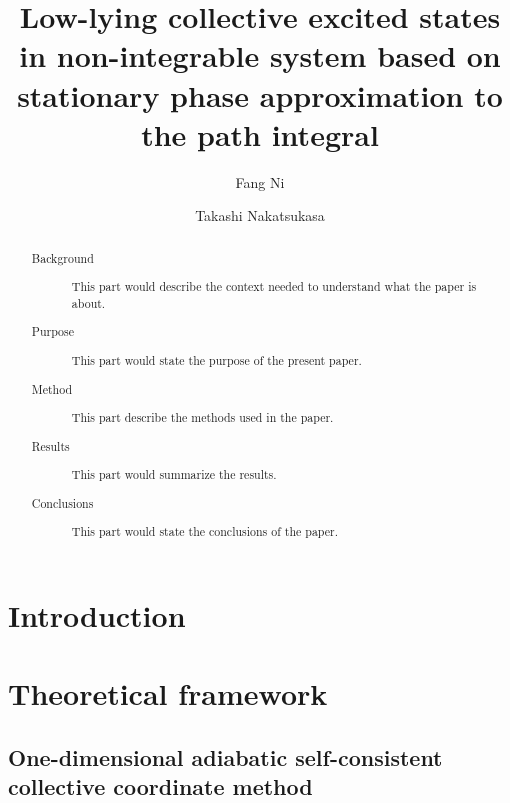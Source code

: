 \documentclass[%
superscriptaddress,
showpacs,
nofootinbib,
amsmath,amssymb,
aps,
prc,
twocolumn,
floatfix ]%
{revtex4-1}
\begin{document}
\renewcommand{\thefootnote}{\fnsymbol{footnote}}

\title{Low-lying collective excited states in non-integrable system based on stationary phase approximation to the path integral}%

\author{Fang Ni}
\author{Takashi Nakatsukasa}

\begin{abstract}
\begin{description}
\item[Background] This part would describe the
context needed to understand what the paper
is about.
\item[Purpose] This part would state the purpose
of the present paper.
\item[Method] This part describe the methods
used in the paper.
\item[Results] This part would summarize the
results.
\item[Conclusions] This part would state the
conclusions of the paper.
\end{description}
\end{abstract}

\maketitle

\section{Introduction}


\section{Theoretical framework}

\subsection{One-dimensional adiabatic self-consistent collective coordinate method}
\label{ASCC}
\end{document}
